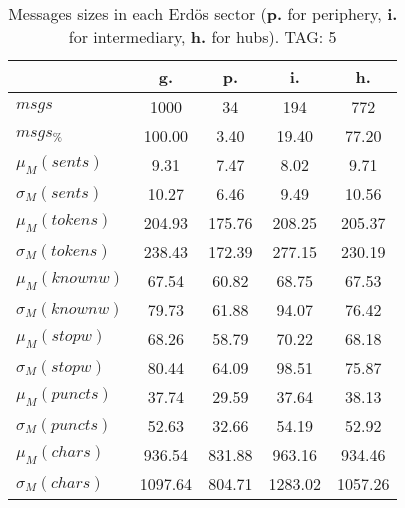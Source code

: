 \begin{table}[h!]
\begin{center}
\begin{tabular}{| l | c | c | c | c |}\hline
 & g. & p. & i. & h. \\\hline
$msgs$ & 1000  & 34  & 194  & 772 \\\hline
$msgs_{\%}$ & 100.00  & 3.40  & 19.40  & 77.20 \\\hline
$\mu_M(sents)$ & 9.31  & 7.47  & 8.02  & 9.71 \\\hline
$\sigma_M(sents)$ & 10.27  & 6.46  & 9.49  & 10.56 \\\hline
$\mu_M(tokens)$ & 204.93  & 175.76  & 208.25  & 205.37 \\\hline
$\sigma_M(tokens)$ & 238.43  & 172.39  & 277.15  & 230.19 \\\hline
$\mu_M(knownw)$ & 67.54  & 60.82  & 68.75  & 67.53 \\\hline
$\sigma_M(knownw)$ & 79.73  & 61.88  & 94.07  & 76.42 \\\hline
$\mu_M(stopw)$ & 68.26  & 58.79  & 70.22  & 68.18 \\\hline
$\sigma_M(stopw)$ & 80.44  & 64.09  & 98.51  & 75.87 \\\hline
$\mu_M(puncts)$ & 37.74  & 29.59  & 37.64  & 38.13 \\\hline
$\sigma_M(puncts)$ & 52.63  & 32.66  & 54.19  & 52.92 \\\hline
$\mu_M(chars)$ & 936.54  & 831.88  & 963.16  & 934.46 \\\hline
$\sigma_M(chars)$ & 1097.64  & 804.71  & 1283.02  & 1057.26 \\\hline
\end{tabular}
\caption{Messages sizes in each Erd\"os sector ({{\bf p.}} for periphery, {{\bf i.}} for intermediary, {{\bf h.}} for hubs). TAG: 5}
\end{center}
\end{table}